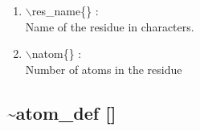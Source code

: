 \documentclass[12pt]{article}
\begin{document}
\begin{enumerate}

 \vspace{0.15in} 
 \item  $\backslash$res\_name\{\} : \\ 
   Name of the residue in characters.

 \vspace{0.15in} 
 \item  $\backslash$natom\{\} : \\ 
   Number of atoms in the residue
\end{enumerate}

\newpage
\subsection*{\bf \~{ }atom\_def []} 
\end{document}
